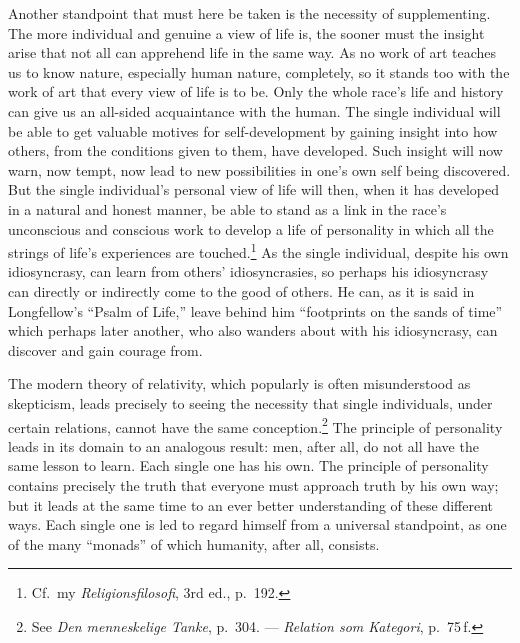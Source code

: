 \documentclass[12pt]{book}
\newcommand{\opage}[1]{\marginnote{\footnotesize\textit{[#1]}}}
\begin{document}
Another standpoint that must here be taken is the necessity of supplementing. The more individual and genuine a
view of life is, the sooner must the insight arise that not all can apprehend life in the same way. As no work of
art teaches us to know nature, especially human nature, completely, so it stands too with the work of art that
every view of life is to be. Only the whole race's life and history can give us an all-sided acquaintance with the
human. The single individual will be able to get valuable motives for self-development by gaining insight into how
others, from the conditions given to them, have developed. Such insight will now warn, now tempt, now lead to new
possibilities in one's own self being discovered. But the single individual's personal view of life will then,
when it \opage{71}has developed in a natural and honest manner, be able to stand as a link in the race's unconscious and
conscious work to develop a life of personality in which all the strings of life's experiences are
touched.\footnote{Cf.\ my \textit{Religionsfilosofi}, 3rd ed., p.\ 192.} As the single individual, despite his own
idiosyncrasy, can learn from others' idiosyncrasies, so perhaps his idiosyncrasy can directly or indirectly come to
the good of others. He can, as it is said in Longfellow's ``Psalm of Life,'' leave behind him ``footprints on the
sands of time'' which perhaps later another, who also wanders about with his idiosyncrasy, can discover and gain
courage from.

The modern theory of relativity, which popularly is often misunderstood as skepticism, leads precisely to seeing
the necessity that single individuals, under certain relations, cannot have the same conception.\footnote{See
\textit{Den menneskelige Tanke}, p.\ 304. --- \textit{Relation som Kategori}, p.\ 75\,f.} The principle of
personality leads in its domain to an analogous result: men, after all, do not all have the same lesson to learn.
Each single one has his own. The principle of personality contains precisely the truth that everyone must approach
truth by his own way; but it leads at the same time to an ever better understanding of these different ways. Each
single one is led to regard himself from a universal standpoint, as one of the many ``monads'' of which humanity, after
all, consists.
\end{document}
